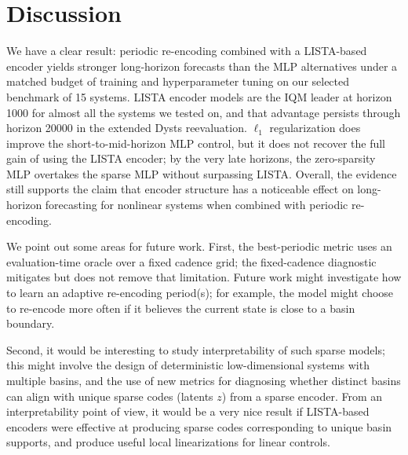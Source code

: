 \documentclass{article}
\begin{document}
\section{Discussion}
\label{sec:discussion}

We have a clear result: periodic re-encoding combined with a LISTA-based encoder yields stronger long-horizon forecasts than the MLP alternatives under a matched budget of training and hyperparameter tuning on our selected benchmark of 15 systems.
LISTA encoder models are the IQM leader at horizon 1000 for almost all the systems we tested on, and that advantage persists through horizon 20000 in the extended Dysts reevaluation. $\ell_1$ regularization does improve the short-to-mid-horizon MLP control, but it does not recover the full gain of using the LISTA encoder; by the very late horizons, the zero-sparsity MLP overtakes the sparse MLP without surpassing LISTA. Overall, the evidence still supports the claim that encoder structure has a noticeable effect on long-horizon forecasting for nonlinear systems when combined with periodic re-encoding. 

We point out some areas for future work. First, the best-periodic metric uses an evaluation-time oracle over a fixed cadence grid; the fixed-cadence diagnostic mitigates but does not remove that limitation. Future work might investigate how to learn an adaptive re-encoding period(s); for example, the model might choose to re-encode more often if it believes the current state is close to a basin boundary.

Second, it would be interesting to study interpretability of such sparse models; this might involve the design of deterministic low-dimensional systems with multiple basins, and the use of new metrics for diagnosing whether distinct basins can align with unique sparse codes (latents $z$) from a sparse encoder. From an interpretability point of view, it would be a very nice result if LISTA-based encoders were effective at producing sparse codes corresponding to unique basin supports, and produce useful local linearizations for linear controls.





\appendix


\end{document}
